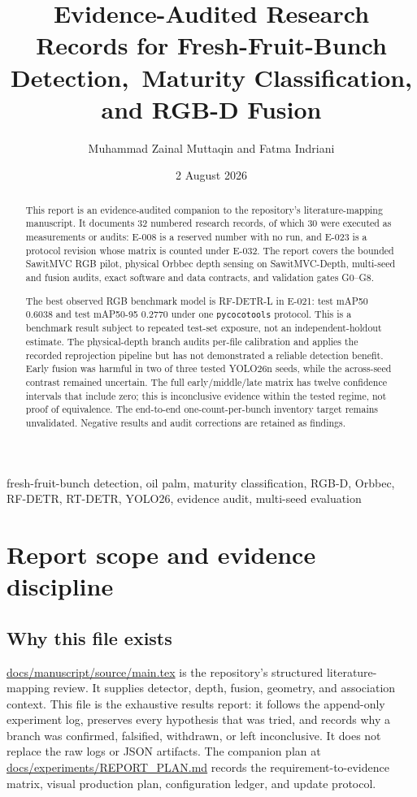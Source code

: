 \documentclass[preprint,12pt]{elsarticle}
\title{Evidence-Audited Research Records for Fresh-Fruit-Bunch Detection,\
Maturity Classification, and RGB-D Fusion}
\author{Muhammad Zainal Muttaqin and Fatma Indriani}
\date{2 August 2026}
\newcommand{\pathcode}[1]{\scriptsize\url{#1}}
\newcommand{\E}[1]{E-#1}
\newcommand{\G}[1]{G#1}
\newcommand{\mAP}{mAP}
\begin{document}
\begin{frontmatter}
\maketitle
\begin{abstract}
This report is an evidence-audited companion to the repository's
literature-mapping manuscript. It documents 32 numbered research records,
of which 30 were executed as measurements or audits: E-008 is a reserved
number with no run, and E-023 is a protocol revision whose matrix is counted
under E-032. The report covers the bounded SawitMVC RGB pilot, physical Orbbec
depth sensing on SawitMVC-Depth, multi-seed and fusion audits, exact software
and data contracts, and validation gates \G{0}--\G{8}.

The best observed RGB benchmark model is RF-DETR-L in \E{021}: test \mAP50{}
\(0.6038\) and test \mAP50-95 \(0.2770\) under one \texttt{pycocotools}
protocol. This is a benchmark result subject to repeated test-set exposure,
not an independent-holdout estimate. The physical-depth branch audits
per-file calibration and applies the recorded reprojection pipeline but has not demonstrated a
reliable detection benefit. Early fusion was harmful in two of three tested
YOLO26n seeds, while the across-seed contrast remained uncertain. The full
early/middle/late matrix has twelve confidence intervals that include zero;
this is inconclusive evidence within the tested regime, not proof of
equivalence. The end-to-end one-count-per-bunch inventory target remains
unvalidated. Negative results and audit corrections are retained as findings.
\end{abstract}
\begin{keyword}
fresh-fruit-bunch detection, oil palm, maturity classification, RGB-D,
Orbbec, RF-DETR, RT-DETR, YOLO26, evidence audit, multi-seed evaluation
\end{keyword}
\end{frontmatter}

\section{Report scope and evidence discipline}
\label{sec:scope}
\subsection{Why this file exists}
\pathcode{docs/manuscript/source/main.tex} is the repository's structured
literature-mapping review. It supplies detector, depth, fusion, geometry, and
association context. This file is the exhaustive results report: it follows
the append-only experiment log, preserves every hypothesis that was tried,
and records why a branch was confirmed, falsified, withdrawn, or left
inconclusive. It does not replace the raw logs or JSON artifacts.
The companion plan at
\pathcode{docs/experiments/REPORT_PLAN.md} records the requirement-to-evidence
matrix, visual production plan, configuration ledger, and update protocol.
\end{document}
